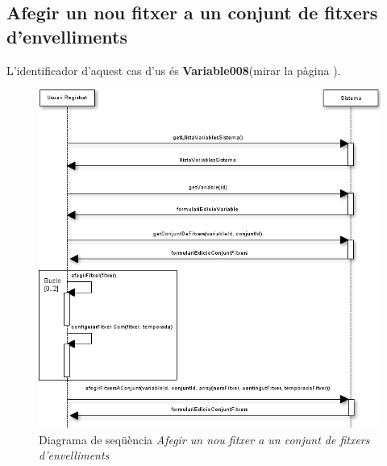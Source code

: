 \subsection*{Afegir un nou fitxer a un conjunt de fitxers d'envelliments}
L'identificador d'aquest cas d'us \'{e}s \textbf{Variable008}(mirar la p\`{a}gina \pageref{variable008}).
\begin{figure}[H]
  \centering
  \includegraphics[scale=0.6]{img/specification/SequenceAddNewFilesToSeasonSet.png}
  \caption{Diagrama de seqüència \textit{Afegir un nou fitxer a un conjunt de fitxers d'envelliments}}
  \label{fig:sequenceaddnewseason}
\end{figure}

